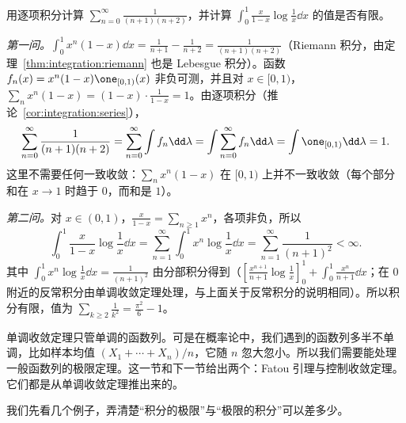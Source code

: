 \begin{workedexample}\label{we:integration:series-telescoping}
用逐项积分计算 $\displaystyle\sum_{n=0}^\infty\frac1{(n+1)(n+2)}$，并计算 $\displaystyle\int_0^1\frac{x}{1-x}\log\frac1x\dd x$ 的值是否有限。
\end{workedexample}
\begin{solution}
\emph{第一问。}$\int_0^1x^n(1-x)\dd x=\frac1{n+1}-\frac1{n+2}=\frac1{(n+1)(n+2)}$（Riemann 积分，由定理~\ref{thm:integration:riemann} 也是 Lebesgue 积分）。函数 $f_n(x)=x^n(1-x)\one_{[0,1)}(x)$ 非负可测，并且对 $x\in[0,1)$，$\sum_nx^n(1-x)=(1-x)\cdot\frac1{1-x}=1$。由逐项积分（推论~\ref{cor:integration:series}），
\[
\sum_{n=0}^\infty\frac1{(n+1)(n+2)}=\sum_{n=0}^\infty\int f_n\dd\lambda=\int\sum_{n=0}^\infty f_n\dd\lambda=\int\one_{[0,1)}\dd\lambda=1 .
\]
这里不需要任何一致收敛：$\sum_nx^n(1-x)$ 在 $[0,1)$ 上并不一致收敛（每个部分和在 $x\to1$ 时趋于 $0$，而和是 $1$）。

\emph{第二问。}对 $x\in(0,1)$，$\frac x{1-x}=\sum_{n\geqslant1}x^n$，各项非负，所以
\[
\int_0^1\frac x{1-x}\log\frac1x\dd x=\sum_{n=1}^\infty\int_0^1x^n\log\frac1x\dd x=\sum_{n=1}^\infty\frac1{(n+1)^2}<\infty .
\]
其中 $\int_0^1x^n\log\frac1x\dd x=\frac1{(n+1)^2}$ 由分部积分得到（$[\frac{x^{n+1}}{n+1}\log\frac1x]_0^1+\int_0^1\frac{x^n}{n+1}\dd x$；在 $0$ 附近的反常积分由单调收敛定理处理，与上面关于反常积分的说明相同）。所以积分有限，值为 $\sum_{k\geqslant2}\frac1{k^2}=\frac{\pi^2}6-1$。
\end{solution}


单调收敛定理只管单调的函数列。可是在概率论中，我们遇到的函数列多半不单调，比如样本均值 $(X_1+\cdots+X_n)/n$，它随 $n$ 忽大忽小。所以我们需要能处理一般函数列的极限定理。这一节和下一节给出两个：Fatou 引理与控制收敛定理。它们都是从单调收敛定理推出来的。

我们先看几个例子，弄清楚“积分的极限”与“极限的积分”可以差多少。

